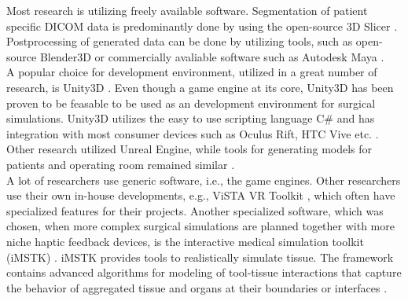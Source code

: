 Most research is utilizing freely available software.
Segmentation of patient specific DICOM data is predominantly done by using the open-source 3D Slicer \cite{Barber.2018,Barber.2020}.
Postprocessing of generated data can be done by utilizing tools, such as open-source Blender3D or commercially avaliable software such as Autodesk Maya \cite{Barber.2020,Parham.2019,Sampogna.2017}.
\\ A popular choice for development environment, utilized in a great number of research, is Unity3D \cite{Parham.2019,Pulijala.2017,Sampogna.2017}.
Even though a game engine at its core, Unity3D has been proven to be feasable to be used as an development environment for surgical simulations.
Unity3D utilizes the easy to use scripting language C\# and has integration with most consumer devices such as Oculus Rift, HTC Vive etc. \cite{wang2010new}.
\\
Other research utilized Unreal Engine, while tools for generating models for patients and operating room remained similar \cite{Barber.2020}.
\\
A lot of researchers use generic software, i.e., the game engines. Other researchers use their own in-house developments, e.g., ViSTA VR Toolkit \cite{RN70}, which often 
have specialized features for their projects.
Another specialized software, which was chosen, when more complex surgical simulations are planned together with more niche haptic feedback devices, is 
the interactive medical simulation toolkit (iMSTK) \cite{VenkataS.Arikatla.2018}.
iMSTK provides tools to realistically simulate tissue. 
The framework contains advanced algorithms for modeling of tool-tissue interactions that capture the behavior of 
aggregated tissue and organs at their boundaries or interfaces \cite{VenkataS.Arikatla.2018}.